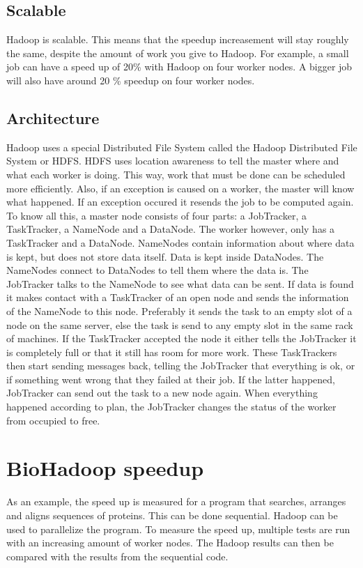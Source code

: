 \documentclass[a4paper]{article}
\begin{document}
  \subsection{Scalable}
    Hadoop is scalable. This means that the speedup increasement will stay
    roughly the same, despite the amount of work you give to Hadoop.
    For example, a small job can have a speed up of 20\% with Hadoop on four
    worker nodes. A bigger job will also have around 20 \% speedup on four
    worker nodes.
    
  \subsection{Architecture}
    Hadoop uses a special Distributed File System called the Hadoop
    Distributed File System or HDFS. HDFS uses location awareness to tell
    the master where and what each worker is doing. This way, work that must
    be done can be scheduled more efficiently. Also, if an exception is caused
    on a worker, the master will know what happened. If an exception occured
    it resends the job to be computed again.\\
    To know all this, a master node consists of four parts: a JobTracker,
    a TaskTracker, a NameNode and a DataNode. The worker however, only has a
    TaskTracker and a DataNode.
    NameNodes contain information about where data is kept, but does not store
    data itself. Data is kept inside DataNodes. The NameNodes connect to 
    DataNodes to tell them where the data is.
    The JobTracker talks to the NameNode
    to see what data can be sent. If data is found it makes contact with a
    TaskTracker of an open node and sends the information of the NameNode
    to this node. Preferably it sends the task to an empty slot of a node
    on the same server, else the task is send to any empty slot in the same
    rack of machines. If the TaskTracker accepted the node it either tells
    the JobTracker it is completely full or that it still has room for more
    work. These TaskTrackers then start sending messages back, telling the
    JobTracker that everything is ok, or if something went wrong that they
    failed at their job. If the latter happened, JobTracker can send out
    the task to a new node again. When everything happened according to plan,
    the JobTracker changes the status of the worker from occupied to free.
    
  \section{BioHadoop speedup}
    As an example, the speed up is measured for a program that searches,
    arranges and aligns sequences of proteins. This can be done sequential.
    Hadoop can be used to parallelize the program. To measure the speed up,
    multiple tests are run with an increasing amount of worker nodes. The
    Hadoop results can then be compared with the results from the sequential code.
    
\end{document}
